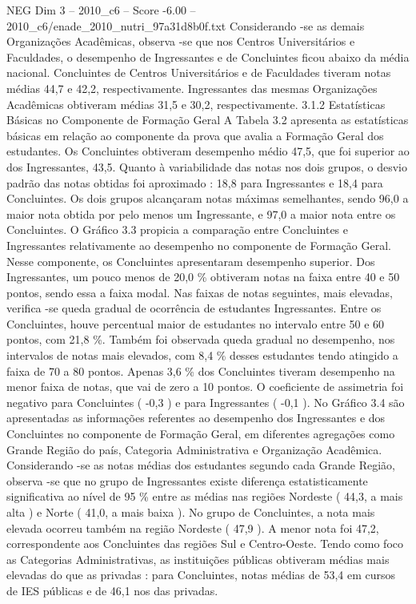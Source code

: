 \begin{textsample}{NEG Dim 3 – 2010\_c6 – Score -6.00 – 2010\_c6/enade\_2010\_nutri\_97a31d8b0f.txt}
Considerando -se as demais Organizações Acadêmicas, observa -se que nos Centros Universitários e Faculdades, o desempenho de Ingressantes e de Concluintes ficou abaixo da média nacional.
Concluintes de Centros Universitários e de Faculdades tiveram notas médias 44,7 e 42,2, respectivamente.
Ingressantes das mesmas Organizações Acadêmicas obtiveram médias 31,5 e 30,2, respectivamente. 3.1.2 Estatísticas Básicas no Componente de Formação Geral A Tabela 3.2 apresenta as estatísticas básicas em relação ao componente da prova que avalia a Formação Geral dos estudantes.
Os Concluintes obtiveram desempenho médio 47,5, que foi superior ao dos Ingressantes, 43,5.
Quanto à variabilidade das notas nos dois grupos, o desvio padrão das notas obtidas foi aproximado : 18,8 para Ingressantes e 18,4 para Concluintes.
Os dois grupos alcançaram notas máximas semelhantes, sendo 96,0 a maior nota obtida por pelo menos um Ingressante, e 97,0 a maior nota entre os Concluintes.
O Gráfico 3.3 propicia a comparação entre Concluintes e Ingressantes relativamente ao desempenho no componente de Formação Geral.
Nesse componente, os Concluintes apresentaram desempenho superior.
Dos Ingressantes, um pouco menos de 20,0 \% obtiveram notas na faixa entre 40 e 50 pontos, sendo essa a faixa modal.
Nas faixas de notas seguintes, mais elevadas, verifica -se queda gradual de ocorrência de estudantes Ingressantes.
Entre os Concluintes, houve percentual maior de estudantes no intervalo entre 50 e 60 pontos, com 21,8 \%.
Também foi observada queda gradual no desempenho, nos intervalos de notas mais elevados, com 8,4 \% desses estudantes tendo atingido a faixa de 70 a 80 pontos.
Apenas 3,6 \% dos Concluintes tiveram desempenho na menor faixa de notas, que vai de zero a 10 pontos.
O coeficiente de assimetria foi negativo para Concluintes ( -0,3 ) e para Ingressantes ( -0,1 ).
No Gráfico 3.4 são apresentadas as informações referentes ao desempenho dos Ingressantes e dos Concluintes no componente de Formação Geral, em diferentes agregações como Grande Região do país, Categoria Administrativa e Organização Acadêmica.
Considerando -se as notas médias dos estudantes segundo cada Grande Região, observa -se que no grupo de Ingressantes existe diferença estatisticamente significativa ao nível de 95 \% entre as médias nas regiões Nordeste ( 44,3, a mais alta ) e Norte ( 41,0, a mais baixa ).
No grupo de Concluintes, a nota mais elevada ocorreu também na região Nordeste ( 47,9 ).
A menor nota foi 47,2, correspondente aos Concluintes das regiões Sul e Centro-Oeste.
Tendo como foco as Categorias Administrativas, as instituições públicas obtiveram médias mais elevadas do que as privadas : para Concluintes, notas médias de 53,4 em cursos de IES públicas e de 46,1 nos das privadas.

\end{textsample}
